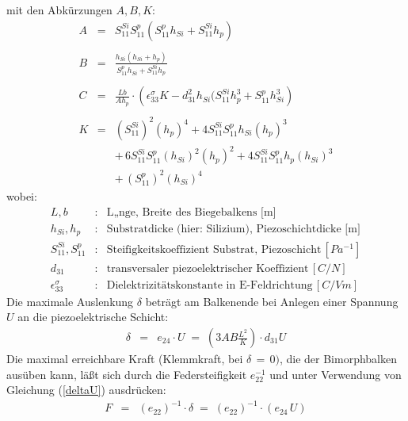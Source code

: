 mit den Abkürzungen $ A, B, K $:
%
\begin{eqnarray*}
   A & = & S^{Si}_{11} S^{p}_{11} \left( S^{p}_{11} h_{Si}
           + S^{Si}_{11} h_{p} \right )
\\ \\
   B & = & \frac{h_{Si} (h_{Si}  +  h_{p}) }{ S^{p}_{11} h_{Si}
             +  S^{Si}_{11} h_{p}}
\\ \\
   C & = & \frac{Lb}{Ah_{p}} \cdot \left( \epsilon^{\sigma}_{33}K -
    d_{31}^{2} h_{Si} (S^{Si}_{11} h_{p}^{3} + S^{p}_{11} h_{Si}^{3} \right)
\\ \\
   K & = & (S^{Si}_{11})^{2} (h_{p})^{4}  +  4S^{Si}_{11}
                   S^{p}_{11} h_{Si}(h_{p})^{3} \nonumber \\
     &   & + \, 6S^{Si}_{11} S^{p}_{11} (h_{Si})^{2} (h_{p})^{2}  +
                4S^{Si}_{11} S^{p}_{11} h_{p} (h_{Si})^{3} \nonumber \\
     &   & + \, (S^{p}_{11})^{2}(h_{Si})^{4}
 \end{eqnarray*}
wobei:
\begin{eqnarray*}
 L, b                      & : &
  \mbox{L„nge, Breite des Biegebalkens [m]} \\
 h_{Si},h_{p}              & : &
  \mbox{Substratdicke (hier: Silizium), Piezoschichtdicke [m]}   \\
 S^{Si}_{11}, S^{p}_{11}   & : &
  \mbox{Steifigkeitskoeffizient Substrat, Piezoschicht} \, [Pa^{-1}] \\
 d_{31} & : & \mbox{transversaler piezoelektrischer Koeffizient} \, [C/N] \\
 \epsilon^{\sigma}_{33}    & : &
  \mbox{Dielektrizitätskonstante in E-Feldrichtung} \, [C/Vm]
\end{eqnarray*}
%
Die maximale Auslenkung $ \delta $ beträgt am Balkenende bei Anlegen
einer Spannung $ U $ an die piezoelektrische Schicht:
\begin{eqnarray}
\label{deltaU}
  \delta & = & e_{24} \cdot U \; = \;
  \left( 3 AB \frac{{L}^2}{K} \right) \cdot d_{31} U
\end{eqnarray}
Die maximal erreichbare Kraft (Klemmkraft, bei  $ \delta \, = \, 0) $,
die der Bimorphbalken ausüben kann, läßt sich durch die
Federsteifigkeit $e_{22}^{-1}$ und unter Verwendung von Gleichung
(\ref{deltaU}) ausdrücken:
\begin{eqnarray}
      F & = & (e_{22})^{-1} \cdot \delta \;
          = \; (e_{22})^{-1} \cdot (e_{24} \, U)
\end{eqnarray}
